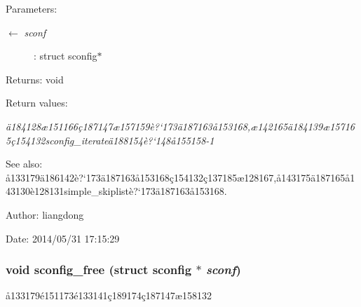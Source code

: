 \begin{Desc}
\item[Parameters:]
\begin{description}
\item[\mbox{$\leftarrow$} {\em sconf}]: struct sconfig$\ast$ \end{description}
\end{Desc}
\begin{Desc}
\item[Returns:]void \end{Desc}
\begin{Desc}
\item[Return values:]
\begin{description}
\item[{\em \"{a}184128\ae{}151166\c{c}187147\ae{}157159\`{e}?`173\"{a}187163\aa{}153168,\ae{}142165\"{a}184139\ae{}157165\c{c}154132sconfig\_\-iterate\"{a}188154\`{e}?`148\aa{}155158-1}]\end{description}
\end{Desc}
\begin{Desc}
\item[See also:]\aa{}133179\"{a}186142\`{e}?`173\"{a}187163\aa{}153168\c{c}154132\c{c}137185\ae{}128167,\aa{}143175\"{a}187165\aa{}143130\`{e}128131simple\_\-skiplist\`{e}?`173\"{a}187163\aa{}153168. \end{Desc}
\begin{Desc}
\item[Author:]liangdong \end{Desc}
\begin{Desc}
\item[Date:]2014/05/31 17:15:29 \end{Desc}
\subsubsection{\setlength{\rightskip}{0pt plus 5cm}void sconfig\_\-free (struct sconfig $\ast$ {\em sconf})}\label{sconfig_8c_a4}


\aa{}133179\'{e}151173\'{e}133141\c{c}189174\c{c}187147\ae{}158132 

